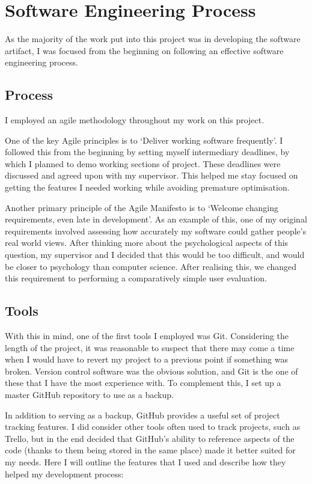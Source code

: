 \chapter{Software Engineering Process}

As the majority of the work put into this project was in developing the software artifact, I was focused from the beginning on following an effective software engineering process.

\section{Process}
I employed an agile\cite{Agile} methodology throughout my work on this project. 

One of the key Agile principles is to `Deliver working software frequently'\cite{AgileKey}. I followed this from the beginning by setting myself intermediary deadlines, by which I planned to demo working sections of project. These deadlines were discussed and agreed upon with my supervisor. This helped me stay focused on getting the features I needed working while avoiding premature optimisation.

Another primary principle of the Agile Manifesto is to `Welcome changing requirements, even late in development'\cite{AgileKey}. As an example of this, one of my original requirements involved assessing how accurately my software could gather people's real world views. After thinking more about the psychological aspects of this question, my supervisor and I decided that this would be too difficult, and would be closer to psychology than computer science. After realising this, we changed this requirement to performing a comparatively simple user evaluation. 

\section{Tools}
With this in mind, one of the first tools I employed was Git\cite{Git}.
Considering the length of the project, it was reasonable to suspect that there may come a time when I would have to revert my project to a previous point if something was broken.
Version control software was the obvious solution, and Git is the one of these that I have the most experience with. To complement this, I set up a master GitHub\cite{GitHub} repository to use as a backup.

In addition to serving as a backup, GitHub provides a useful set of project tracking features. 
I did consider other tools often used to track projects, such as Trello\cite{Trello}, but in the end decided that GitHub's ability to reference aspects of the code (thanks to them being stored in the same place) made it better suited for my needs. 
Here I will outline the features that I used and describe how they helped my development process:

